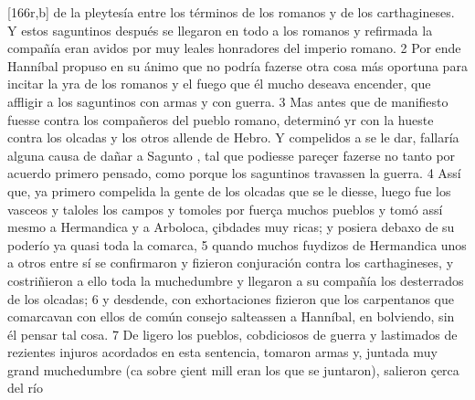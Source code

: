 \documentclass[11pt,twoside]{article}\makeatletter
\def\persName{}\def\name{}
\def\placeName{}
\begin{document}
[166r,b] de la pleytesía entre los términos de los romanos y de los  {\name carthagineses}. Y estos  {\name saguntinos} después se llegaron en todo a los romanos y refirmada la compañía eran avidos por muy leales honradores del imperio romano. 2 Por ende  {\persName Hanníbal} propuso en su ánimo que no podría fazerse otra cosa más oportuna para incitar la yra de los romanos y el fuego que él mucho deseava encender, que affligir a los  {\name saguntinos} con armas y con guerra. 3 Mas antes que de manifiesto fuesse contra los compañeros del pueblo romano, determinó yr con la hueste contra los  {\name olcadas} y los otros allende de  {\placeName Hebro}. Y compelidos a se le dar, fallaría alguna causa de dañar a  {\placeName Sagunto} , tal que podiesse pareçer fazerse no tanto por acuerdo primero pensado, como porque los  {\name saguntinos} travassen la guerra. 4 Assí que, ya primero compelida la gente de los  {\name olcadas} que se le diesse, luego fue  los  {\name vasceos} y  {\name taloles} los campos y tomoles por fuerça muchos pueblos y tomó assí mesmo a  {\placeName Hermandica} y a  {\placeName Arboloca}, çibdades muy ricas; y posiera debaxo de su poderío ya quasi toda la comarca, 5 quando muchos fuydizos de  {\placeName Hermandica} unos a otros entre sí se confirmaron y fizieron conjuración contra los  {\name carthagineses}, y costriñieron a ello toda la muchedumbre y llegaron a su compañía los desterrados de los olcadas; 6 y desdende, con exhortaciones fizieron que los carpentanos que comarcavan con ellos de común consejo salteassen a  {\persName Hanníbal}, en bolviendo, sin él pensar tal cosa. 7 De ligero los pueblos, cobdiciosos de guerra y lastimados de rezientes injuros acordados en esta sentencia, tomaron armas y, juntada muy grand muchedumbre (ca sobre çient mill eran los que se juntaron), salieron çerca del río %
\end{document}

